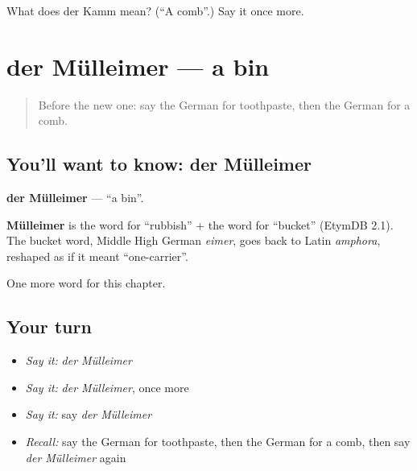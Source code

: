 \begin{tcolorbox}[breakable,colback=teal!4,colframe=teal!35!black,title={Before you move on}]
What does der Kamm mean? (\textquotedblleft{}A comb\textquotedblright{}.) Say it once more.
\end{tcolorbox}
\section[der Mülleimer]{der Mülleimer — a bin}

\label{lesson:GE-C115-muelleimer}



\begin{quote}
Before the new one: say the German for toothpaste, then the German for a comb.
\end{quote}

\subsection*{You'll want to know: der Mülleimer}
\textbf{der Mülleimer} — \textquotedblleft{}a bin\textquotedblright{}.

\begin{cousinweb}
\textbf{Mülleimer} is the word for \textquotedblleft{}rubbish\textquotedblright{} + the word for \textquotedblleft{}bucket\textquotedblright{} (EtymDB 2.1). The bucket word, Middle High German \emph{eimer}, goes back to Latin \emph{amphora}, reshaped as if it meant \textquotedblleft{}one-carrier\textquotedblright{}.
\end{cousinweb}

\begin{grammarlens}[title={What you've built}]
One more word for this chapter.
\end{grammarlens}

\subsection*{Your turn}
\begin{itemize}
\raggedright
  \item \emph{Say it:} \emph{der Mülleimer}
  \item \emph{Say it:} \emph{der Mülleimer}, once more
  \item \emph{Say it:} say \emph{der Mülleimer}
  \item \emph{Recall:} say the German for toothpaste, then the German for a comb, then say \emph{der Mülleimer} again
\end{itemize}

